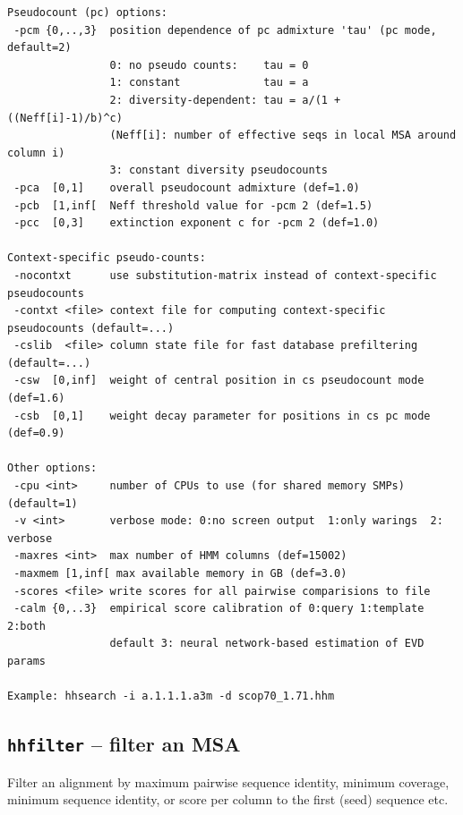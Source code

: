 \documentclass[11pt,a4paper]{article}
\begin{document}
\begin{verbatim}
Pseudocount (pc) options:                                                        
 -pcm {0,..,3}  position dependence of pc admixture 'tau' (pc mode, default=2) 
                0: no pseudo counts:    tau = 0                                  
                1: constant             tau = a                                  
                2: diversity-dependent: tau = a/(1 + ((Neff[i]-1)/b)^c)          
                (Neff[i]: number of effective seqs in local MSA around column i) 
                3: constant diversity pseudocounts                               
 -pca  [0,1]    overall pseudocount admixture (def=1.0)                        
 -pcb  [1,inf[  Neff threshold value for -pcm 2 (def=1.5)                      
 -pcc  [0,3]    extinction exponent c for -pcm 2 (def=1.0)                     

Context-specific pseudo-counts:                                                  
 -nocontxt      use substitution-matrix instead of context-specific pseudocounts 
 -contxt <file> context file for computing context-specific pseudocounts (default=...)
 -cslib  <file> column state file for fast database prefiltering (default=...)
 -csw  [0,inf]  weight of central position in cs pseudocount mode (def=1.6)
 -csb  [0,1]    weight decay parameter for positions in cs pc mode (def=0.9)

Other options: 
 -cpu <int>     number of CPUs to use (for shared memory SMPs) (default=1)
 -v <int>       verbose mode: 0:no screen output  1:only warings  2: verbose   
 -maxres <int>  max number of HMM columns (def=15002)             
 -maxmem [1,inf[ max available memory in GB (def=3.0)          
 -scores <file> write scores for all pairwise comparisions to file         
 -calm {0,..3}  empirical score calibration of 0:query 1:template 2:both   
                default 3: neural network-based estimation of EVD params   

Example: hhsearch -i a.1.1.1.a3m -d scop70_1.71.hhm 
\end{verbatim} 
\normalsize


\subsection{{\tt hhfilter} -- filter an MSA}

Filter an alignment by maximum pairwise sequence identity, minimum coverage,
minimum sequence identity, or score per column to the first (seed) sequence etc.
\end{document}
